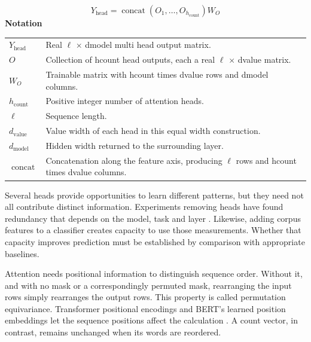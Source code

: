 \documentclass[10pt,letterpaper]{article}
\newcommand{\notlabel}{\noindent\textbf{Notation}\par\nobreak\vspace{4pt}}
\begin{document}
\par\noindent\begin{minipage}{\linewidth}
\begin{equation}\label{eq:multihead}
Y_{\mathrm{head}}=\operatorname{concat}(O_1,\ldots,O_{h_{\mathrm{count}}})W_O
\end{equation}
\notlabel
{\fontsize{8.5}{10.5}\selectfont\setlength{\tabcolsep}{0pt}\renewcommand{\arraystretch}{1.12}
\begin{tabularx}{\linewidth}{@{}p{.14\linewidth}X@{}}
$Y_{\mathrm{head}}$ & Real \ensuremath{\ell} \ensuremath{\times} dmodel multi head output matrix.\\
$O$ & Collection of hcount head outputs, each a real \ensuremath{\ell} \ensuremath{\times} dvalue matrix.\\
$W_O$ & Trainable matrix with hcount times dvalue rows and dmodel columns.\\
$h_{\mathrm{count}}$ & Positive integer number of attention heads.\\
$\ell$ & Sequence length.\\
$d_{\mathrm{value}}$ & Value width of each head in this equal width construction.\\
$d_{\mathrm{model}}$ & Hidden width returned to the surrounding layer.\\
$\operatorname{concat}$ & Concatenation along the feature axis, producing \ensuremath{\ell} rows and hcount times dvalue columns.\\
\end{tabularx}}
\par\vspace{2pt}
\end{minipage}\par
Several heads provide opportunities to learn different patterns, but they need not all contribute distinct information. Experiments removing heads have found redundancy that depends on the model, task and layer \cite{michel}. Likewise, adding corpus features to a classifier creates capacity to use those measurements. Whether that capacity improves prediction must be established by comparison with appropriate baselines.\par

Attention needs positional information to distinguish sequence order. Without it, and with no mask or a correspondingly permuted mask, rearranging the input rows simply rearranges the output rows. This property is called permutation equivariance. Transformer positional encodings and BERT's learned position embeddings let the sequence positions affect the calculation \cite{transformer,bert}. A count vector, in contrast, remains unchanged when its words are reordered.\par
\end{document}
